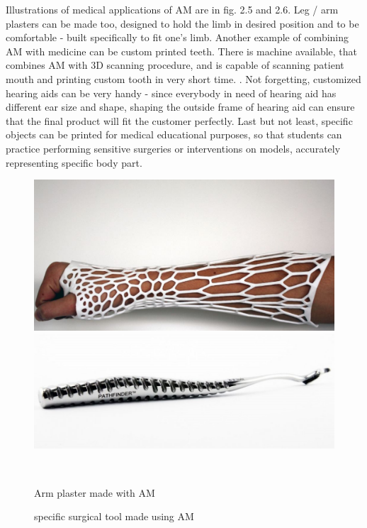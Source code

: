 \documentclass[a4paper, 11pt, reqno]{report}
\begin{document}
	Illustrations of medical applications of AM are in fig. 2.5 and 2.6. Leg / arm plasters can be made too, designed to hold the limb in desired position and to be comfortable - built specifically to fit one's limb. Another example of combining AM with medicine can be custom printed teeth. There is machine available, that combines AM with 3D scanning procedure, and is capable of scanning patient mouth and printing custom tooth in very short time. \cite{DentalPrinter}. Not forgetting, customized hearing aids can be very handy - since everybody in need of hearing aid has different ear size and shape, shaping the outside frame of hearing aid can ensure that the final product will fit the customer perfectly. Last but not least, specific objects can be printed for medical educational purposes, so that students can practice performing sensitive  surgeries or interventions on models, accurately representing specific body part.
%
\begin{figure}[h]
  \centering
  \begin{minipage}[b]{0.45\textwidth}
    \includegraphics[width=\textwidth]{armPlaster}
  \end{minipage}
  \hfill
  \begin{minipage}[b]{0.45\textwidth}
    \includegraphics[width=\textwidth]{surgicalTool}
  \end{minipage}
  \\[5pt]
  \begin{minipage}[t]{0.45\textwidth}
    \caption{Arm plaster made with AM}
  \end{minipage}
  \hfill
  \begin{minipage}[t]{0.45\textwidth}
    \caption{specific surgical tool made using AM}
  \end{minipage}
\end{figure}
\end{document}
